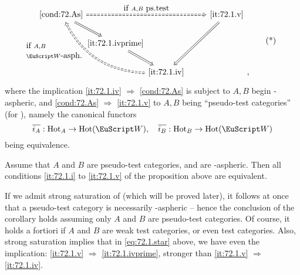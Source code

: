 \begin{propositionnum}
\begin{equation}
\begin{tabular}{@{}c@{}}
\begin{tikzcd}[baseline=(O.base),math mode=false,%
        arrows=Rightarrow,column sep=-3pt]
        \textup{\ref{cond:72.As}}
        \ar[rrrr,dashed,"{if $A,B$ ps.test}"{inner sep=3pt}]\ar[dr] & & & &
        \textup{\ref{it:72.1.v}} \ar[ddll] \\
        & \textup{\ref{it:72.1.ivprime}} \ar[dr] & & \phantom{hello} & \\
        & & |[alias=O]| \textup{\ref{it:72.1.iv}}
        \ar[uull,dashed,bend left,%
        "{\begin{tabular}{@{}l@{}}
            if $A,B$ \\ \scrW-asph.
          \end{tabular}}"{inner sep=-3pt,near end}] & &
      \end{tikzcd},
    \end{tabular}\tag{*}
  \end{equation}
  where the implication \textup{\ref{it:72.1.iv} $\Rightarrow$
    \ref{cond:72.As}} is subject to $A,B$ begin \scrW-aspheric, and
  \textup{\ref{cond:72.As} $\Rightarrow$ \ref{it:72.1.v}} to $A,B$
  being ``pseudo-test categories'' \textup(for \scrW\textup), namely the canonical
  functors
  \[\overline{i_A}: \mathrm{Hot}_A \to \HotOf(\scrW), \quad
  \overline{i_B} : \mathrm{Hot}_B \to \HotOf(\scrW)\]
  being equivalence.
\end{propositionnum}
\begin{corollary}
  Assume that $A$ and $B$ are pseudo-test categories, and are
  \scrW-aspheric. Then all conditions \textup{\ref{it:72.1.i}} to
  \textup{\ref{it:72.1.v}} of the proposition above are equivalent.
\end{corollary}
\begin{remarknum}
  If we admit strong saturation of \scrW{} (which will be proved
  later), it follows at once that a pseudo-test category is
  necessarily \scrW-aspheric -- hence the conclusion of the corollary
  holds assuming only $A$ and $B$ are pseudo-test categories. Of
  course, it holds a fortiori if $A$ and $B$ are weak test categories,
  or even test categories. Also, strong saturation implies that in
  \eqref{eq:72.1.star} above, we have even the implication:
  \ref{it:72.1.v} $\Rightarrow$ \ref{it:72.1.ivprime}, stronger than
  \ref{it:72.1.v} $\Rightarrow$ \ref{it:72.1.iv}.
\end{remarknum}


